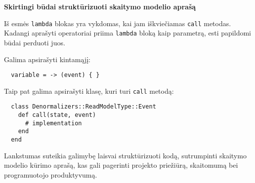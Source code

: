 \textbf{Skirtingi būdai struktūrizuoti skaitymo modelio aprašą}

Iš esmės \lstinline|lambda| blokas yra vykdomas, kai jam iškviečiamas \lstinline|call| metodas. Kadangi aprašyti operatoriai priima \lstinline|lambda| bloką kaip parametrą, esti papildomi būdai perduoti juos.

Galima apsirašyti kintamąjį:

\begin{lstlisting}
  variable = -> (event) { }
\end{lstlisting}

Taip pat galima apsirašyti klasę, kuri turi \lstinline|call| metodą:

\begin{lstlisting}
  class Denormalizers::ReadModelType::Event
    def call(state, event)
      # implementation
    end
  end
\end{lstlisting}

Lankstumas suteikia galimybę laisvai struktūrizuoti kodą, sutrumpinti skaitymo modelio kūrimo aprašą, kas gali pagerinti projekto priežiūrą, skaitomumą bei programuotojo produktyvumą.








